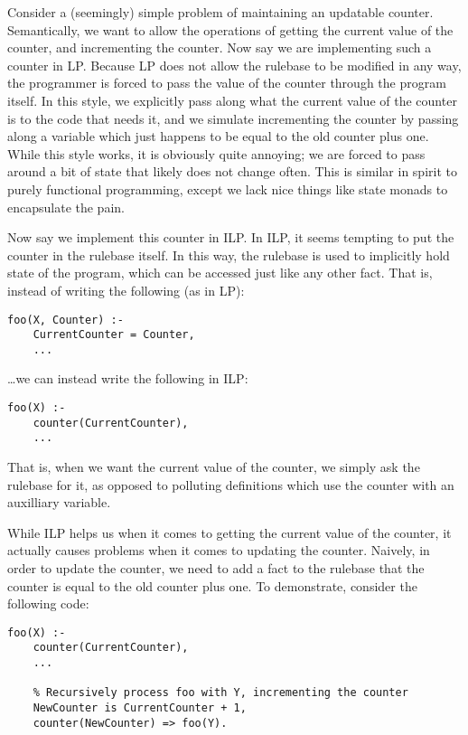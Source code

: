 Consider a (seemingly) simple problem of maintaining an updatable counter.
Semantically, we want to allow the operations of getting the current value of the counter, and incrementing the counter.
Now say we are implementing such a counter in LP.
Because LP does not allow the rulebase to be modified in any way, the programmer is forced to pass the value of the counter through the program itself.
In this style, we explicitly pass along what the current value of the counter is to the code that needs it, and we simulate incrementing the counter by passing along a variable which just happens to be equal to the old counter plus one.
While this style works, it is obviously quite annoying; we are forced to pass around a bit of state that likely does not change often.
This is similar in spirit to purely functional programming, except we lack nice things like state monads to encapsulate the pain.

Now say we implement this counter in ILP.
In ILP, it seems tempting to put the counter in the rulebase itself.
In this way, the rulebase is used to implicitly hold state of the program, which can be accessed just like any other fact.
That is, instead of writing the following (as in LP):

\begin{verbatim}
foo(X, Counter) :-
    CurrentCounter = Counter,
    ...
\end{verbatim}

\noindent \ldots we can instead write the following in ILP:

\begin{verbatim}
foo(X) :-
    counter(CurrentCounter),
    ...
\end{verbatim}

\noindent That is, when we want the current value of the counter, we simply ask the rulebase for it, as opposed to polluting definitions which use the counter with an auxilliary variable.

While ILP helps us when it comes to getting the current value of the counter, it actually causes problems when it comes to updating the counter.
Naively, in order to update the counter, we need to add a fact to the rulebase that the counter is equal to the old counter plus one.
To demonstrate, consider the following code:

\begin{verbatim}
foo(X) :-
    counter(CurrentCounter),
    ...

    % Recursively process foo with Y, incrementing the counter
    NewCounter is CurrentCounter + 1,
    counter(NewCounter) => foo(Y).
\end{verbatim}

